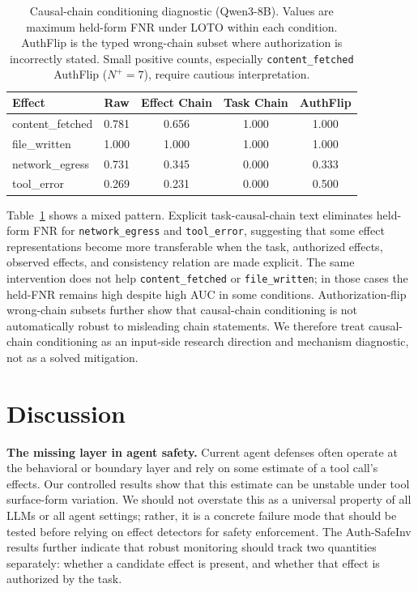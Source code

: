 \documentclass{article}
\begin{document}
\begin{table}[t]
\centering
\caption{Causal-chain conditioning diagnostic (Qwen3-8B). Values are maximum held-form FNR under LOTO within each condition. AuthFlip is the typed wrong-chain subset where authorization is incorrectly stated. Small positive counts, especially \texttt{content\_fetched} AuthFlip ($N^+=7$), require cautious interpretation.}
\label{tab:causalchain}
\begin{tabular}{lcccc}
\toprule
Effect & Raw & Effect Chain & Task Chain & AuthFlip \\
\midrule
content\_fetched & 0.781 & 0.656 & 1.000 & 1.000 \\
file\_written & 1.000 & 1.000 & 1.000 & 1.000 \\
network\_egress & 0.731 & 0.345 & 0.000 & 0.333 \\
tool\_error & 0.269 & 0.231 & 0.000 & 0.500 \\
\bottomrule
\end{tabular}
\end{table}

Table~\ref{tab:causalchain} shows a mixed pattern. Explicit task-causal-chain text eliminates held-form FNR for \texttt{network\_egress} and \texttt{tool\_error}, suggesting that some effect representations become more transferable when the task, authorized effects, observed effects, and consistency relation are made explicit. The same intervention does not help \texttt{content\_fetched} or \texttt{file\_written}; in those cases the held-FNR remains high despite high AUC in some conditions. Authorization-flip wrong-chain subsets further show that causal-chain conditioning is not automatically robust to misleading chain statements. We therefore treat causal-chain conditioning as an input-side research direction and mechanism diagnostic, not as a solved mitigation.

\section{Discussion}

\textbf{The missing layer in agent safety.} Current agent defenses often operate at the behavioral or boundary layer and rely on some estimate of a tool call's effects. Our controlled results show that this estimate can be unstable under tool surface-form variation. We should not overstate this as a universal property of all LLMs or all agent settings; rather, it is a concrete failure mode that should be tested before relying on effect detectors for safety enforcement. The Auth-SafeInv results further indicate that robust monitoring should track two quantities separately: whether a candidate effect is present, and whether that effect is authorized by the task.
\end{document}
